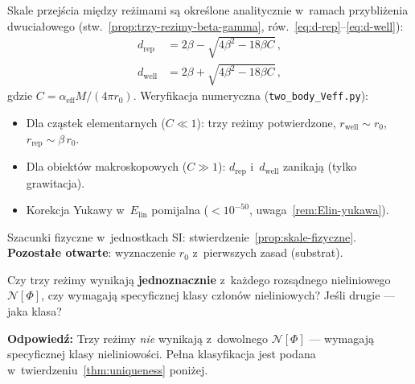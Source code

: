 \begin{problem}\label{prob:skale}
Skale przej\'scia mi\k{e}dzy re\.zimami s\k{a} okre\'slone
analitycznie w~ramach przybli\.zenia dwucia\l{}owego
(stw.~\ref{prop:trzy-rezimy-beta-gamma},
r\'ow.~\ref{eq:d-rep}--\ref{eq:d-well}):
\begin{align*}
  d_{\mathrm{rep}} &= 2\beta - \sqrt{4\beta^2 - 18\beta C}\,,\\
  d_{\mathrm{well}} &= 2\beta + \sqrt{4\beta^2 - 18\beta C}\,,
\end{align*}
gdzie $C = \alpha_{\mathrm{eff}} M/(4\pi r_0)$.
Weryfikacja numeryczna (\texttt{two\_body\_Veff.py}):
\begin{itemize}[nosep]
  \item Dla cz\k{a}stek elementarnych ($C \ll 1$): trzy re\.zimy
        potwierdzone, $r_{\mathrm{well}} \sim r_0$,
        $r_{\mathrm{rep}} \sim \beta\,r_0$.
  \item Dla obiekt\'ow makroskopowych ($C \gg 1$): $d_{\mathrm{rep}}$
        i~$d_{\mathrm{well}}$ zanikaj\k{a} (tylko grawitacja).
  \item Korekcja Yukawy w~$E_{\mathrm{lin}}$ pomijalna
        ($< 10^{-50}$, uwaga~\ref{rem:Elin-yukawa}).
\end{itemize}

Szacunki fizyczne w~jednostkach SI: stwierdzenie~\ref{prop:skale-fizyczne}.
\textbf{Pozosta\l{}e otwarte}: wyznaczenie $r_0$ z~pierwszych zasad (substrat).
\end{problem}

\begin{problem}\label{prob:jednoznacznosc}
Czy trzy re\.zimy wynikaj\k{a} \textbf{jednoznacznie}
z~ka\.zdego rozs\k{a}dnego nieliniowego $\mathcal{N}[\Phi]$,
czy wymagaj\k{a} specyficznej klasy cz\l{}on\'ow nieliniowych?
Je\'sli drugie --- jaka klasa?

\medskip\noindent
\textbf{Odpowied\'z:} Trzy re\.zimy \emph{nie} wynikaj\k{a} z~dowolnego
$\mathcal{N}[\Phi]$ --- wymagaj\k{a} specyficznej klasy nieliniowo\'sci.
Pe\l{}na klasyfikacja jest podana w~twierdzeniu~\ref{thm:uniqueness}
poni\.zej.
\end{problem}

